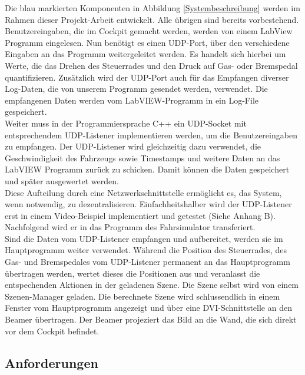 Die blau markierten Komponenten in Abbildung \ref{Systembeschreibung} werden im Rahmen dieser Projekt-Arbeit entwickelt. Alle übrigen sind bereits vorbestehend. \\
Benutzereingaben, die im Cockpit gemacht werden, werden von einem LabView Programm eingelesen. Nun benötigt es einen UDP-Port,  über den verschiedene Eingaben an das Programm weitergeleitet werden. Es handelt sich hierbei um Werte, die das Drehen des Steuerrades und den Druck auf Gas- oder Bremspedal quantifizieren. Zusätzlich wird der UDP-Port auch für das Empfangen diverser Log-Daten, die von unserem Programm gesendet werden, verwendet. Die empfangenen Daten werden vom LabVIEW-Programm  in ein Log-File gespeichert.\\
Weiter muss in der Programmiersprache C++ ein UDP-Socket mit entsprechendem UDP-Listener implementieren werden, um die Benutzereingaben zu empfangen. Der UDP-Listener wird gleichzeitig dazu verwendet, die Geschwindigkeit des Fahrzeugs sowie Timestamps und weitere Daten an das LabVIEW Programm zurück zu schicken. Damit können die Daten gespeichert und später ausgewertet werden.\\
Diese Aufteilung durch eine Netzwerkschnittstelle ermöglicht es,  das System, wenn notwendig, zu dezentralisieren. Einfachheitshalber wird der UDP-Listener erst in einem Video-Beispiel implementiert und getestet (Siehe Anhang B). Nachfolgend wird er in das Programm des Fahrsimulator transferiert.\\
Sind die Daten vom UDP-Listener empfangen und aufbereitet, werden sie im Hauptprogramm weiter verwendet. Während die Position des Steuerrades, des Gas- und Bremspedales vom UDP-Listener permanent an das Hauptprogramm übertragen werden, wertet dieses die Positionen aus und veranlasst die entspechenden Aktionen in der geladenen Szene. 
Die Szene selbst wird von einem Szenen-Manager geladen. Die berechnete Szene wird schlussendlich in einem Fenster vom Hauptprogramm angezeigt und über eine DVI-Schnittstelle an den Beamer übertragen. Der Beamer projeziert das Bild an die Wand, die sich direkt vor dem Cockpit befindet. 

\subsection{Anforderungen}
